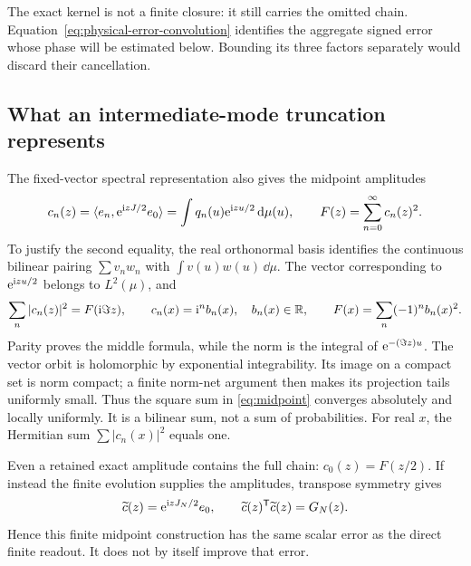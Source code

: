The exact kernel is not a finite closure: it still carries the omitted
chain. Equation~\eqref{eq:physical-error-convolution} identifies the
aggregate signed error whose phase will be estimated below. Bounding
its three factors separately would discard their cancellation.

\subsection{What an intermediate-mode truncation represents}

The fixed-vector spectral representation also gives the midpoint
amplitudes
\begin{equation}
 c_n(z)=\langle e_n,\mathrm e^{\mathrm i zJ/2}e_0\rangle
       =\int q_n(u)\mathrm e^{\mathrm i zu/2}\,\mathrm d\mu(u),\qquad
 F(z)=\sum_{n=0}^{\infty}c_n(z)^2.
 \label{eq:midpoint}
\end{equation}
To justify the second equality, the real orthonormal basis identifies
the continuous bilinear pairing \(\sum v_nw_n\) with
\(\int v(u)w(u)\,\dd\mu\). The vector corresponding to
\(\mathrm e^{\mathrm i zu/2}\) belongs to \(L^2(\mu)\), and
\begin{equation}
 \sum_n|c_n(z)|^2=F(\mathrm i\Im z),\qquad
 c_n(x)=\mathrm i^n b_n(x),\quad b_n(x)\in\mathbb R,\qquad
 F(x)=\sum_n(-1)^n b_n(x)^2.
 \label{eq:midpoint-signs}
\end{equation}
Parity proves the middle formula, while the norm is the integral of
\(\mathrm e^{-(\Im z)u}\). The vector orbit is holomorphic by exponential
integrability. Its image on a compact set is norm compact; a finite
norm-net argument then makes its projection tails uniformly small.
Thus the square sum in \eqref{eq:midpoint} converges absolutely and
locally uniformly. It is a bilinear sum, not a sum of probabilities.
For real \(x\), the Hermitian sum \(\sum|c_n(x)|^2\) equals one.

Even a retained exact amplitude contains the full chain:
\(c_0(z)=F(z/2)\). If instead the finite evolution supplies the
amplitudes, transpose symmetry gives
\begin{equation}
 \widetilde c(z)=\mathrm e^{\mathrm i zJ_N/2}e_0,\qquad
 \widetilde c(z)^{\mathsf T}\widetilde c(z)=G_N(z).
 \label{eq:midpoint-baseline}
\end{equation}
Hence this finite midpoint construction has the same scalar error as
the direct finite readout. It does not by itself improve that error.
